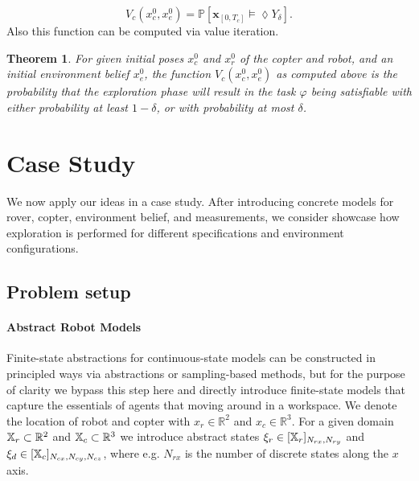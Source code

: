 \documentclass[conference]{IEEEtran}
\newtheorem{theorem}{Theorem}
\begin{document}

\begin{equation}
\label{eq:coptervalue}
	V_c(x^0_c, x^0_e) = \mathbb{P} \left[ \mathbf{x}_{[0, T_c]} \models \lozenge Y_\delta \right].
\end{equation}
Also this function can be computed via value iteration.

\begin{theorem}
	For given initial poses $x_c^0$ and $x_r^0$ of the copter and robot, and an initial environment belief $x_e^0$, the function $V_c(x_c^0, x_e^0)$ as computed above is the probability that the exploration phase will result in the task $\varphi$ being satisfiable with either probability at least $1- \delta$, or with probability at most $\delta$.  
\end{theorem}



\section{Case Study}
\label{sec:casestudy}

We now apply our ideas in a case study. After introducing concrete models for rover, copter, environment belief, and measurements, we consider showcase how exploration is performed for different specifications and environment configurations.

\subsection{Problem setup}

\paragraph{Abstract Robot Models}

Finite-state abstractions for continuous-state models can be constructed in principled ways via abstractions or sampling-based methods, but for the purpose of clarity we bypass this step here and directly introduce finite-state models that capture the essentials of agents that moving around in a workspace. We denote the location of robot and copter with $x_r \in \mathbb{R}^2$ and $x_c \in \mathbb{R}^3$. For a given domain $\mathbb{X}_r \subset \mathbb{R}^2$ and $\mathbb{X}_c \subset \mathbb{R}^3$ we introduce abstract states $\xi_r \in [\mathbb{X}_r]_{N_{rx}, N_{ry}}$ and $\xi_d \in [\mathbb{X}_c]_{N_{cx}, N_{cy}, N_{cz}}$, where e.g. $N_{rx}$ is the number of discrete states along the $x$ axis. 
\end{document}
